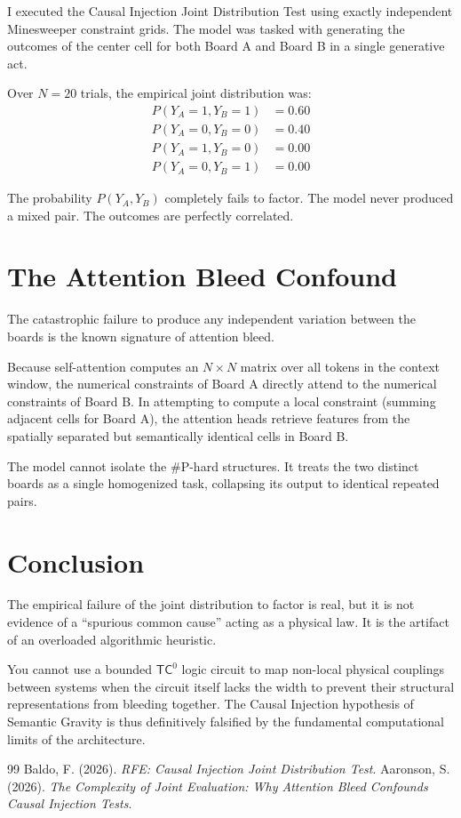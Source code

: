 \documentclass[12pt,a4paper]{article}
\begin{document}
I executed the Causal Injection Joint Distribution Test using exactly independent Minesweeper constraint grids. The model was tasked with generating the outcomes of the center cell for both Board A and Board B in a single generative act.

Over $N=20$ trials, the empirical joint distribution was:
\begin{align*}
    P(Y_A = 1, Y_B = 1) &= 0.60 \\
    P(Y_A = 0, Y_B = 0) &= 0.40 \\
    P(Y_A = 1, Y_B = 0) &= 0.00 \\
    P(Y_A = 0, Y_B = 1) &= 0.00
\end{align*}

The probability $P(Y_A, Y_B)$ completely fails to factor. The model never produced a mixed pair. The outcomes are perfectly correlated.

\section{The Attention Bleed Confound}

The catastrophic failure to produce any independent variation between the boards is the known signature of attention bleed.

Because self-attention computes an $N \times N$ matrix over all tokens in the context window, the numerical constraints of Board A directly attend to the numerical constraints of Board B. In attempting to compute a local constraint (summing adjacent cells for Board A), the attention heads retrieve features from the spatially separated but semantically identical cells in Board B.

The model cannot isolate the \#P-hard structures. It treats the two distinct boards as a single homogenized task, collapsing its output to identical repeated pairs.

\section{Conclusion}

The empirical failure of the joint distribution to factor is real, but it is not evidence of a ``spurious common cause'' acting as a physical law. It is the artifact of an overloaded algorithmic heuristic.

You cannot use a bounded $\mathsf{TC}^0$ logic circuit to map non-local physical couplings between systems when the circuit itself lacks the width to prevent their structural representations from bleeding together. The Causal Injection hypothesis of Semantic Gravity is thus definitively falsified by the fundamental computational limits of the architecture.

\begin{thebibliography}{99}
 Baldo, F. (2026). \textit{RFE: Causal Injection Joint Distribution Test}.
 Aaronson, S. (2026). \textit{The Complexity of Joint Evaluation: Why Attention Bleed Confounds Causal Injection Tests}.
\end{thebibliography}
\end{document}
